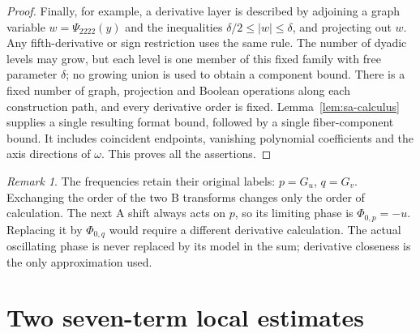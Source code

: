 \documentclass[11pt,a4paper]{article}
\numberwithin{equation}{section}
\theoremstyle{remark}
\newtheorem{remark}[theorem]{Remark}
\begin{document}
\begin{proof}
Finally, for example, a derivative layer is described by adjoining a
graph variable $w=\Psi_{2222}(y)$ and the inequalities
$\delta/2\le|w|\le\delta$, and projecting out $w$. Any fifth-derivative
or sign restriction uses the same rule. The number of dyadic levels
may grow, but each level is one member of this fixed family with free
parameter $\delta$; no growing union is used to obtain a component
bound. There is a fixed number of graph, projection and Boolean
operations along each construction path, and every derivative order is
fixed. Lemma~\ref{lem:sa-calculus} supplies a single resulting format
bound, followed by a single fiber-component bound. It includes coincident
endpoints, vanishing polynomial coefficients and the axis directions
of $\omega$. This proves all the assertions.
\end{proof}

\begin{remark}\label{rem:labels}
The frequencies retain their original labels: $p=G_u$, $q=G_v$.
Exchanging the order of the two B transforms changes only the order of
calculation. The next A shift always acts on $p$, so its limiting phase is
$\Phi_{0,p}=-u$. Replacing it by $\Phi_{0,q}$ would require a different
derivative calculation. The actual oscillating phase is never replaced by
its model in the sum; derivative closeness is the only approximation used.
\end{remark}

\section{Two seven-term local estimates}
\label{sec:local}
\end{document}
